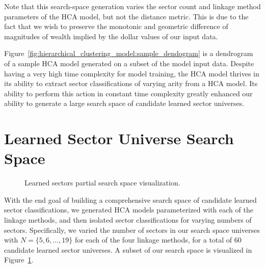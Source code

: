 \documentclass[../main.tex]{subfiles}
\begin{document}
Note that this search-space generation varies the sector count and linkage method parameters of the HCA model, but not the distance metric. This is due to the fact that we wish to preserve the monotonic and geometric difference of magnitudes of wealth implied by the dollar values of our input data.

Figure~\ref{fig:hierarchical_clustering_model:sample_dendogram} is a dendrogram of a sample HCA model generated on a subset of the model input data. Despite having a very high time complexity for model training, the HCA model thrives in its ability to extract sector classifications of varying arity from a HCA model. Its ability to perform this action in constant time complexity greatly enhanced our ability to generate a large search space of candidate learned sector universes.


\pagebreak

\section{Learned Sector Universe Search Space}


\begin{figure}[h]
    \centering
    \caption{Learned sectors partial search space visualization.}
    \label{fig:hierarchical_clustering_model:partial_search_space}
\end{figure}

With the end goal of building a comprehensive search space of candidate learned sector classifications, we generated HCA models parameterized with each of the linkage methods, and then isolated sector classifications for varying numbers of sectors. Specifically, we varied the number of sectors in our search space universes with $N = \{5, 6, \ldots, 19 \}$ for each of the four linkage methods, for a total of 60 candidate learned sector universes. A subset of our search space is visualized in Figure~\ref{fig:hierarchical_clustering_model:partial_search_space}.
\end{document}
